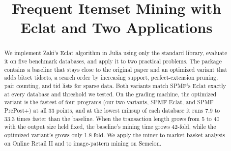 \documentclass[conference]{IEEEtran}
\title{Frequent Itemset Mining with Eclat and Two Applications}
\author{\IEEEauthorblockN{Hung \and Thien \and Phat}
\IEEEauthorblockA{University of Science, VNU-HCM}}
\begin{document}
\maketitle
\begin{abstract}
We implement Zaki's Eclat algorithm in Julia using only the standard library, evaluate
it on five benchmark databases, and apply it to two practical problems. The package
contains a baseline that stays close to the original paper and an optimized variant that
adds bitset tidsets, a search order by increasing support, perfect-extension pruning,
pair counting, and tid lists for sparse data. Both variants match SPMF's Eclat exactly at
every database and threshold we tested. On the grading machine, the optimized variant is
the fastest of four programs (our two variants, SPMF Eclat, and SPMF PrePost+) at all 33
points, and at the lowest minsup of each database it runs 7.9 to 33.3 times faster than
the baseline. When the transaction length grows from 5 to 40 with the output size held
fixed, the baseline's mining time grows 42-fold, while the optimized variant's grows only
1.8-fold. We apply the miner to market basket analysis on Online Retail II and to
image-pattern mining on Semeion.
\end{abstract}







\end{document}
